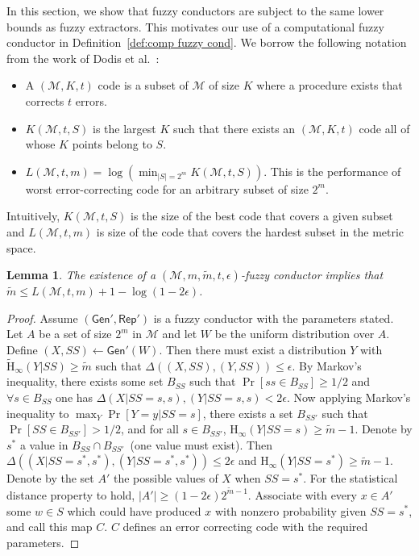 \documentclass[11pt]{article}
\newcommand{\defref}[1]{\mbox{Definition~\ref{#1}}}
\newcommand{\class}[1]{{\ensuremath{\mathsf{#1}}}}
\newcommand{\gen}{\ensuremath{\class{Gen}}\xspace}
\newcommand{\rep}{\ensuremath{\class{Rep}}\xspace}
\newcommand{\Hoo}{\mathrm{H}_\infty}
\newcommand{\Hav}{\tilde{\mathrm{H}}_\infty}
\newtheorem{lemma}[theorem]{Lemma}
\begin{document}
\noindent In this section, we show that fuzzy conductors are subject to the same lower bounds as fuzzy extractors.  This motivates our use of a computational fuzzy conductor in \defref{def:comp fuzzy cond}.
We borrow the following notation from the work of Dodis et al.~\cite{DBLP:journals/siamcomp/DodisORS08}:
\begin{itemize}
\item A $(\mathcal{M}, K, t)$ code is a subset of $\mathcal{M}$ of size $K$ where a procedure exists that corrects $t$ errors.
\item $K(\mathcal{M}, t, S)$ is the largest $K$ such that there exists an $(\mathcal{M}, K, t)$ code all of whose $K$ points belong to $S$.
\item $L(\mathcal{M}, t, m) = \log (\min_{|S| = 2^m} K(\mathcal{M}, t, S))$.  This is the performance of worst error-correcting code for an arbitrary subset of size $2^m$.
\end{itemize}
Intuitively, $K(\mathcal{M}, t, S)$ is the size of the best code that covers a given subset and $L(\mathcal{M}, t, m)$ is size of the code that covers the hardest subset in the metric space.
\begin{lemma}
The existence of a $(\mathcal{M}, m, \tilde{m}, t, \epsilon)$-fuzzy conductor implies that $\tilde{m}\leq L(\mathcal{M}, t, m) +1 -\log (1-2\epsilon)$.
\end{lemma}
\begin{proof}  Assume $(\gen', \rep')$ is a fuzzy conductor with the parameters stated.  Let $A$ be a set of size $2^m$ in $\mathcal{M}$ and let $W$ be the uniform distribution over $A$.  Define $(X,SS) \leftarrow \gen'(W)$.  Then there must exist a distribution $Y$ with $\Hav(Y|SS) \geq \tilde{m}$ such that $\Delta((X,SS), (Y, SS))\leq \epsilon$.  By Markov's inequality, there exists some set $B_{SS}$ such that $\Pr[ss\in B_{SS}] \geq 1/2$ and $\forall s\in B_{SS}$ one has $\Delta(X | SS = s, s ), (Y | SS = s, s)<2\epsilon$.  Now applying Markov's inequality to $\max_{Y} \Pr[Y=y | SS=s]$, there exists a set $B_{SS'}$ such that $\Pr[SS\in B_{SS'}]>1/2$, and for all $s\in B_{SS'}$, $\Hoo(Y| SS =s ) \geq \tilde{m}-1$.  Denote by $s^*$ a value in $B_{SS}\cap B_{SS'}$~(one value must exist).  Then $\Delta((X | SS =s^* , s^*), (Y| SS = s^*, s^*))\leq 2\epsilon$ and $\Hoo(Y|SS=s^*)\geq \tilde{m}-1$.  Denote by the set $A'$ the possible values of $X$ when $SS=s^*$.  For the statistical distance property to hold, $|A'| \geq  (1-2\epsilon)2^{\tilde{m}-1}$.  Associate with every $x\in A'$ some $w\in S$ which could have produced $x$ with nonzero probability given $SS=s^*$, and call this map $C$.  $C$ defines an error correcting code with the required parameters.
\end{proof}
\end{document}
